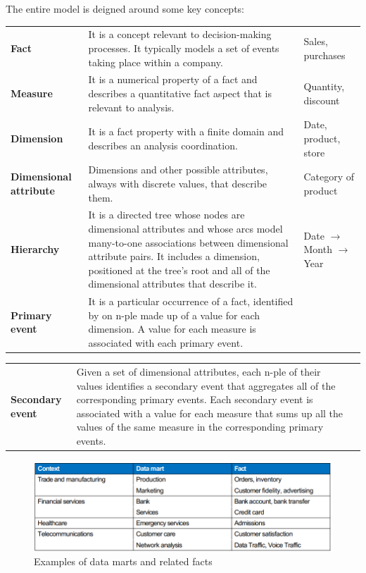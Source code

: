The entire model is deigned around some key concepts:
\begin{center}
    \begin{tabular}{ p{} | p{} | p{}}
        \textbf{Fact} & It is a concept relevant to decision-making processes. It typically models a set of events taking place within a company. & Sales, purchases \\[1.2cm]
        \textbf{Measure} & It is a numerical property of a fact and describes a quantitative fact aspect that is relevant to analysis. & Quantity, discount \\[1.2cm]
        \textbf{Dimension} & It is a fact property with a finite domain and describes an analysis coordination. & Date, product, store \\[0.8cm]
        \textbf{Dimensional attribute} & Dimensions and other possible attributes, always with discrete values, that describe them. & Category of product \\[1.2cm]
        \textbf{Hierarchy} & It is a directed tree whose nodes are dimensional attributes and whose arcs model many-to-one associations between dimensional attribute pairs. It includes a dimension, positioned at the tree's root and all of the dimensional attributes that describe it. & Date $\rightarrow$ Month $\rightarrow$ Year \\[2.5cm]
        \textbf{Primary event} & It is a particular occurrence of a fact, identified by on n-ple made up of a value for each dimension. A value for each measure is associated with each primary event. & 
    \end{tabular}
    \begin{tabular}{ p{} | p{} | p{}}
        \textbf{Secondary event} & Given a set of dimensional attributes, each n-ple of their values identifies a secondary event that aggregates all of the corresponding primary events. Each secondary event is associated with a value for each measure that sums up all the values of the same measure in the corresponding primary events. & 
    \end{tabular}
\end{center}

\begin{figure}[ht!]
    \centering
    \includegraphics[scale=0.7]{images/DFM_DM_facts.png}
    \caption{Examples of data marts and related facts}
    \label{figDMfacts}
\end{figure}

